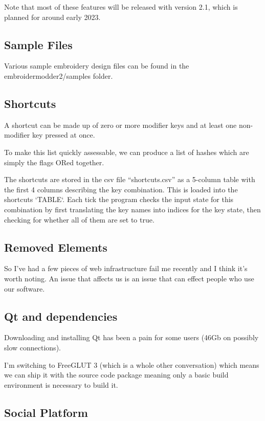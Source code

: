 Note that most of these features will be released with version 2.1, which is planned for around early 2023.

\subsection{Sample Files}

Various sample embroidery design files can be found in the embroidermodder2/samples folder.

\subsection{Shortcuts}

A shortcut can be made up of zero or more modifier keys and at least one non-modifier key pressed at once.

To make this list quickly assessable, we can produce a list of hashes which are simply the flags ORed together.

The shortcuts are stored in the csv file ``shortcuts.csv'' as a 5-column table with the first 4 columns describing the key combination. This is loaded into the shortcuts `TABLE`. Each tick the program checks the input state for this combination by first translating the key names into indices for the key state, then checking for whether all of them are set to true.

\subsection{Removed Elements}

So I've had a few pieces of web infrastructure fail me recently and
I think it's worth noting. An issue that affects us is an issue that
can effect people who use our software.

\subsection{Qt and dependencies}

Downloading and installing Qt has been a pain for some users
(46Gb on possibly slow connections).

I'm switching to FreeGLUT 3 (which is a whole other conversation) which means we
can ship it with the source code package meaning only a basic build
environment is necessary to build it.

\subsection{Social Platform}

